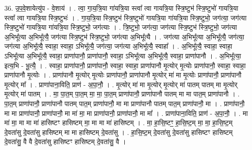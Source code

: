 \documentclass[17pt]{extarticle}
\begin{document}
36. उ॒प॒वे॒शायेत्यु॑प - वे॒शाय॑ । . त्वा॒ गा॒य॒त्रि॒या गा॑यत्रि॒या स्त्वा᳚ त्वा गायत्रि॒या स्त्रि॒ष्टुभ॑ स्त्रि॒ष्टुभो॑ गायत्रि॒या स्त्वा᳚ त्वा गायत्रि॒या स्त्रि॒ष्टुभः॑ । . गा॒य॒त्रि॒या स्त्रि॒ष्टुभ॑ स्त्रि॒ष्टुभो॑ गायत्रि॒या गा॑यत्रि॒या स्त्रि॒ष्टुभो॒ जग॑त्या॒ जग॑त्या स्त्रि॒ष्टुभो॑ गायत्रि॒या गा॑यत्रि॒या स्त्रि॒ष्टुभो॒ जग॑त्याः । . त्रि॒ष्टुभो॒ जग॑त्या॒ जग॑त्या स्त्रि॒ष्टुभ॑ स्त्रि॒ष्टुभो॒ जग॑त्या अ॒भिभू᳚त्या अ॒भिभू᳚त्यै॒ जग॑त्या स्त्रि॒ष्टुभ॑ स्त्रि॒ष्टुभो॒ जग॑त्या अ॒भिभू᳚त्यै । . जग॑त्या अ॒भिभू᳚त्या अ॒भिभू᳚त्यै॒ जग॑त्या॒ जग॑त्या अ॒भिभू᳚त्यै॒ स्वाहा॒ स्वाहा॒ ऽभिभू᳚त्यै॒ जग॑त्या॒ जग॑त्या अ॒भिभू᳚त्यै॒ स्वाहा᳚ । . अ॒भिभू᳚त्यै॒ स्वाहा॒ स्वाहा॒ ऽभिभू᳚त्या अ॒भिभू᳚त्यै॒ स्वाहा॒ प्राणा॑पानौ॒ प्राणा॑पानौ॒ स्वाहा॒ ऽभिभू᳚त्या अ॒भिभू᳚त्यै॒ स्वाहा॒ प्राणा॑पानौ । . अ॒भिभू᳚त्या॒ इत्य॒भि - भू॒त्यै॒ । . स्वाहा॒ प्राणा॑पानौ॒ प्राणा॑पानौ॒ स्वाहा॒ स्वाहा॒ प्राणा॑पानौ मृ॒त्योर् मृ॒त्योः प्राणा॑पानौ॒ स्वाहा॒ स्वाहा॒ प्राणा॑पानौ मृ॒त्योः । . प्राणा॑पानौ मृ॒त्योर् मृ॒त्योः प्राणा॑पानौ॒ प्राणा॑पानौ मृ॒त्योर् मा॑ मा मृ॒त्योः प्राणा॑पानौ॒ प्राणा॑पानौ मृ॒त्योर् मा᳚ । . प्राणा॑पाना॒विति॒ प्राण॑ - अ॒पा॒नौ॒ । . मृ॒त्योर् मा॑ मा मृ॒त्योर् मृ॒त्योर् मा॑ पातम् पातम् मा मृ॒त्योर् मृ॒त्योर् मा॑ पातम् । . मा॒ पा॒त॒म् पा॒त॒म् मा॒ मा॒ पा॒त॒म् प्राणा॑पानौ॒ प्राणा॑पानौ पातम् मा मा पात॒म् प्राणा॑पानौ । . पा॒त॒म् प्राणा॑पानौ॒ प्राणा॑पानौ पातम् पात॒म् प्राणा॑पानौ॒ मा मा प्राणा॑पानौ पातम् पात॒म् प्राणा॑पानौ॒ मा । . प्राणा॑पानौ॒ मा मा प्राणा॑पानौ॒ प्राणा॑पानौ॒ मा मा॑ मा॒ मा प्राणा॑पानौ॒ प्राणा॑पानौ॒ मा मा᳚ । . प्राणा॑पाना॒विति॒ प्राण॑ - अ॒पा॒नौ॒ । . मा मा॑ मा॒ मा मा मा॑ हासिष्टꣳ हासिष्टम् मा॒ मा मा मा॑ हासिष्टम् । . मा॒ हा॒सि॒ष्टꣳ॒॒ हा॒सि॒ष्ट॒म् मा॒ मा॒ हा॒सि॒ष्ट॒म् दे॒वता॑सु दे॒वता॑सु हासिष्टम् मा मा हासिष्टम् दे॒वता॑सु । . हा॒सि॒ष्ट॒म् दे॒वता॑सु दे॒वता॑सु हासिष्टꣳ हासिष्टम् दे॒वता॑सु॒ वै वै दे॒वता॑सु हासिष्टꣳ हासिष्टम् दे॒वता॑सु॒ वै । \newline
\end{document}
